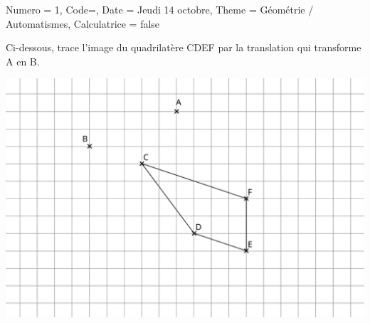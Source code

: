 \documentclass[11pt]{article}
\begin{document}
\begin{Maquette}[IE]{
        Numero = 1, Code={}, Date = Jeudi 14 octobre, Theme = Géométrie / Automatismes, Calculatrice = false
    }

    \begin{exercice}
         Ci-dessous, trace l’image du quadrilatère CDEF par la translation qui transforme A en B.
        \begin{center}
            \includegraphics[width = .85 \linewidth]{Images/Évaluation 2 - Translation.png}
        \end{center}
    \end{exercice}


\end{Maquette}
\end{document}
